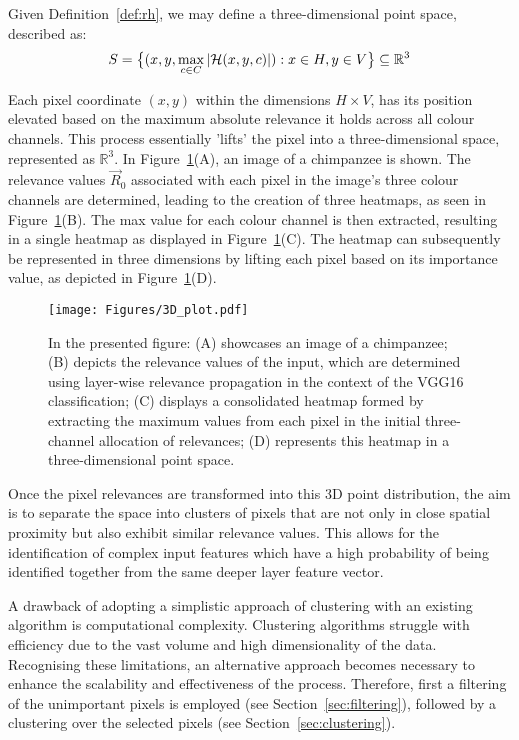 Given Definition~\ref{def:rh}, we may define a three-dimensional point space, described as:
\begin{equation*}
    S = \big\{ (x, y, \max_{c \in C} |\mathcal{H}(x, y, c)| ) : x \in H, y \in V \big\} \subseteq \mathbb{R}^3
\end{equation*}

Each pixel coordinate \( (x, y) \) within the dimensions \( H \times V \), has its position elevated based on the maximum absolute relevance it holds across all colour channels. This process essentially 'lifts' the pixel into a three-dimensional space, represented as \( \mathbb{R}^3 \). In Figure~\ref{Fig:3D}(A), an image of a chimpanzee is shown. The relevance values \( \vec{R}_0 \) associated with each pixel in the image's three colour channels are determined, leading to the creation of three heatmaps, as seen in Figure~\ref{Fig:3D}(B). The max value for each colour channel is then extracted, resulting in a single heatmap as displayed in Figure~\ref{Fig:3D}(C). The heatmap can subsequently be represented in three dimensions by lifting each pixel based on its importance value, as depicted in Figure~\ref{Fig:3D}(D).

\begin{figure}[ht!]
	\begin{center}
		\texttt{[image: Figures/3D\_plot.pdf]}
	\end{center}
	\caption{In the presented figure: (A) showcases an image of a chimpanzee; (B) depicts the relevance values of the input, which are determined using layer-wise relevance propagation in the context of the VGG16 classification; (C) displays a consolidated heatmap formed by extracting the maximum values from each pixel in the initial three-channel allocation of relevances; (D) represents this heatmap in a three-dimensional point space.}
	\label{Fig:3D}
\end{figure}

Once the pixel relevances are transformed into this 3D point distribution, the aim is to separate the space into clusters of pixels that are not only in close spatial proximity but also exhibit similar relevance values. This allows for the identification of complex input features which have a high probability of being identified together from the same deeper layer feature vector.

A drawback of adopting a simplistic approach of clustering with an existing algorithm is computational complexity. Clustering algorithms struggle with efficiency due to the vast volume and high dimensionality of the data. Recognising these limitations, an alternative approach becomes necessary to enhance the scalability and effectiveness of the process. Therefore, first a filtering of the unimportant pixels is employed (see Section~\ref{sec:filtering}), followed by a clustering over the selected pixels (see Section~\ref{sec:clustering}).


